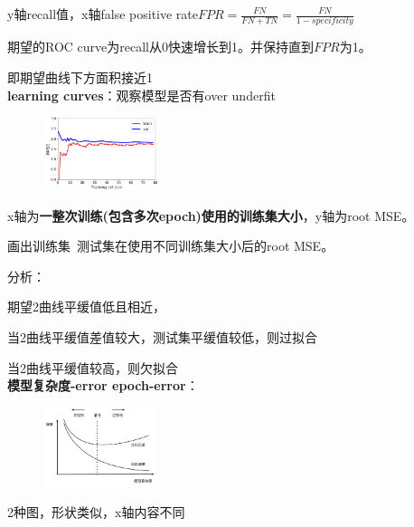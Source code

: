 \documentclass[UTF8]{ctexart}
\begin{document}
  y轴recall值，x轴false positive rate$FPR = \frac{FN}{FN + TN} = \frac{FN}{1-specificity}$

  期望的ROC curve为recall从0快速增长到1。并保持直到$FPR$为1。
  
  \quad 即期望曲线下方面积接近1\\
\textbf{learning curves}：观察模型是否有over underfit

  \begin{figure}[H] %
    \centering %
    \includegraphics[width=0.3\textwidth]{note_images/learning_curve.png} %
  \end{figure}

  x轴为\textbf{一整次训练(包含多次epoch)使用的训练集大小}，y轴为root MSE。

  画出训练集\ 测试集在使用不同训练集大小后的root MSE。

  分析：

  \quad 期望2曲线平缓值低且相近，

  \quad 当2曲线平缓值差值较大，测试集平缓值较低，则过拟合

  \quad 当2曲线平缓值较高，则欠拟合\\
\textbf{模型复杂度-error epoch-error}：

  \begin{figure}[H] %
    \centering %
    \includegraphics[width=0.3\textwidth]{note_images/epoch-complex-error.png} %
  \end{figure}

  2种图，形状类似，x轴内容不同\\


\end{document}
